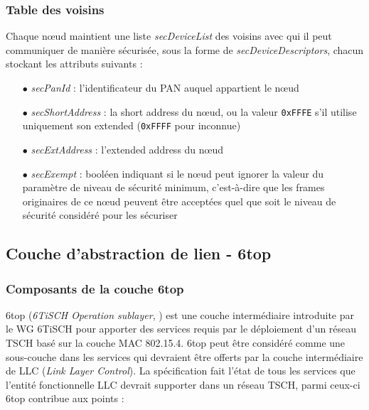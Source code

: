 \documentclass[]{report}
\begin{document}
\subsubsection{Table des voisins}
\label{neighbors_table}

Chaque nœud maintient une liste \textit{secDeviceList} des voisins avec qui il peut communiquer de manière sécurisée, sous la forme de \textit{secDeviceDescriptors}, chacun stockant les attributs suivants :
\vspace{0.2cm}
\begin{itemize}
\item[$\bullet$] \textit{secPanId} : l'identificateur du PAN auquel appartient le nœud
\vspace{0.1cm}
\item[$\bullet$] \textit{secShortAddress} : la short address du nœud, ou la valeur \texttt{0xFFFE} s'il utilise uniquement son extended (\texttt{0xFFFF} pour inconnue)
\vspace{0.1cm}
\item[$\bullet$] \textit{secExtAddress} : l'extended address du nœud
\vspace{0.1cm}
\item[$\bullet$] \textit{secExempt} : booléen indiquant si le nœud peut ignorer la valeur du paramètre de niveau de sécurité minimum, c'est-à-dire que les frames originaires de ce nœud peuvent être acceptées quel que soit le niveau de sécurité considéré pour les sécuriser
\vspace{0.1cm}

\end{itemize}

\newpage

	\subsection{Couche d'abstraction de lien - 6top}
	\label{6top}

\subsubsection{Composants de la couche 6top}

\par 6top (\textit{6TiSCH Operation sublayer}, \cite{rfc8480}) est une couche intermédiaire introduite par le WG 6TiSCH pour apporter des services requis par le déploiement d'un réseau TSCH basé sur la couche MAC 802.15.4. 6top peut être considéré comme une sous-couche dans les services qui devraient être offerts par la couche intermédiaire de LLC (\textit{Link Layer Control}). La spécification \cite{rfc7554} fait l'état de tous les services que l'entité fonctionnelle LLC devrait supporter dans un réseau TSCH, parmi ceux-ci 6top contribue aux points :
\end{document}
